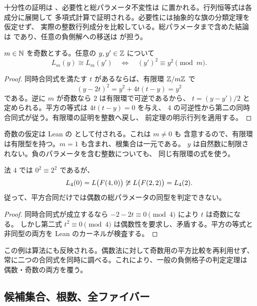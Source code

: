 十分性の証明は 、必要性と総パラメータ不変性は
 に置かれる。行列恒等式は各成分に展開して
多項式計算で証明される。必要性には抽象的な旗の分類定理を仮定せず、
実際の整数行列成分を比較している。総パラメータまで含めた結論は
 であり、任意の負側解への移送は
 が担う。

\begin{theorem}[奇数の総パラメータ]
\label{bp:fiber-odd-square}
\leanok
{}
$m\in\mathbb N$ を奇数とする。任意の $y,y'\in\mathbb Z$ について
\[
 L_m(y)\cong L_m(y')
 \quad\Longleftrightarrow\quad
 (y')^2\equiv y^2\pmod m.
\]
\end{theorem}
\begin{proof}
\leanok
同時合同式を満たす $t$ があるならば、有限環 $\mathbb Z/m\mathbb Z$ で
\[
 (y-2t)^2=y^2+4t(t-y)=y^2
\]
である。逆に $m$ が奇数なら $2$ は有限環で可逆であるから、
$t=(y-y')/2$ と定められる。平方の等式は $4t(t-y)=0$ を与え、
$4$ の可逆性から第二の同時合同式が従う。有限環の証明を整数へ戻し、
前定理の明示行列を適用する。
\end{proof}

奇数の仮定は Lean の  として付される。これは $m\ne0$ も
含意するので、有限環は有限型を持つ。$m=1$ も含まれ、根集合は一元である。
$y$ は自然数に制限されない。負のパラメータを含む整数についても、
同じ有限環の式を使う。

\begin{proposition}[偶数法での平方合同の限界]
\label{bp:fiber-even-example}
\leanok
{}
法 $4$ では $0^2\equiv2^2$ であるが、
\[
 L_4(0)=L\bigl(F(4,0)\bigr)
 \not\cong
 L\bigl(F(2,2)\bigr)=L_4(2).
\]
従って、平方合同だけでは偶数の総パラメータの同型を判定できない。
\end{proposition}
\begin{proof}
\leanok
同時合同式が成立するなら $-2-2t\equiv0\pmod4$ により $t$ は奇数になる。
しかし第二式 $t^2\equiv0\pmod4$ は偶数性を要求し、矛盾する。平方の等式と
非同型の両方を Lean のカーネルが検査する。
\end{proof}

この例は算法にも反映される。偶数法に対して奇数用の平方比較を再利用せず、
常に二つの合同式を同時に調べる。これにより、一般の負側格子の判定定理は
偶数・奇数の両方を覆う。

\subsection{候補集合、根数、全ファイバー}

